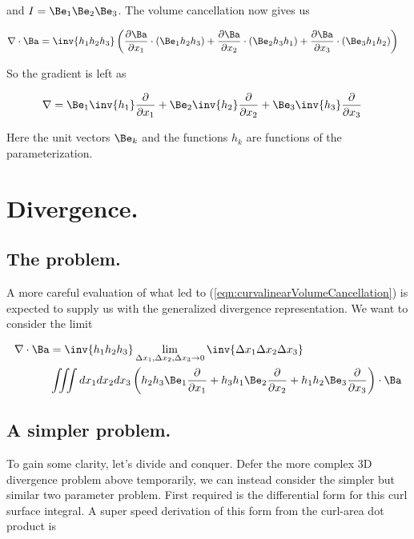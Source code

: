 and $I = \Be_1 \Be_2 \Be_3$.  The volume cancellation now gives us

\begin{align}\label{eqn:curvalinearVolumeCancellation}
\grad \cdot \Ba &=
\inv{h_1 h_2 h_3} \left(
  \PD{x_1}{\Ba} \cdot (\Be_1 h_2 h_3 )
+ \PD{x_2}{\Ba} \cdot (\Be_2 h_3 h_1 )
+ \PD{x_3}{\Ba} \cdot (\Be_3 h_1 h_2 )  \right)
\end{align}

So the gradient is left as

\begin{align}\label{eqn:gradientCurva}
\grad &=
 \Be_1 \inv{h_1} \PD{x_1}{}
+\Be_2 \inv{h_2} \PD{x_2}{}
+\Be_3 \inv{h_3} \PD{x_3}{}
\end{align}

Here the unit vectors $\Be_k$ and the functions $h_k$ are functions of the parameterization.

\section{Divergence.}

\subsection{The problem.}

A more careful evaluation of what led to (\ref{eqn:curvalinearVolumeCancellation}) is expected to supply us with the generalized divergence representation.  We want to consider the limit

\begin{align*}
\grad \cdot \Ba &= 
\inv{h_1 h_2 h_3}
\lim_{
\Delta x_1, \Delta x_2, \Delta x_3 \rightarrow 0}
\inv{\Delta x_1 \Delta x_2 \Delta x_3
} \\
&\iiint dx_1 dx_2 dx_3 \left(
h_2 h_3 \Be_1 \PD{x_1}{}
+h_3 h_1 \Be_2 \PD{x_2}{}
+h_1 h_2 \Be_3 \PD{x_3}{} \right) \cdot \Ba
\end{align*}

\subsection{A simpler problem.}

To gain some clarity, let's divide and conquer.  Defer the more complex 3D divergence problem above temporarily, we can instead consider the simpler but similar two parameter problem.  First required is the differential form for this curl surface integral.  A super speed derivation of this form from the curl-area dot product is

